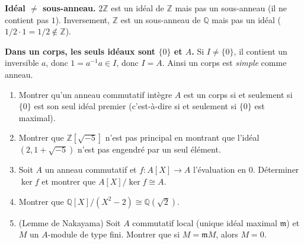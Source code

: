 \vspace{6pt}

\begin{mdframed}[style=cexbar]
  \textbf{Idéal $\neq$ sous-anneau.}\enspace%
  $2\mathbb{Z}$ est un idéal de $\mathbb{Z}$ mais pas un sous-anneau
  (il ne contient pas $1$). Inversement, $\mathbb{Z}$ est un sous-anneau de
  $\mathbb{Q}$ mais pas un idéal ($1/2 \cdot 1 = 1/2 \notin \mathbb{Z}$).

  \smallskip\noindent
  \textbf{Dans un corps, les seuls idéaux sont $\{0\}$ et $A$.}\enspace%
  Si $I \neq \{0\}$, il contient un inversible $a$, donc $1 = a^{-1}a \in I$,
  donc $I = A$. Ainsi un corps est \emph{simple} comme anneau.
\end{mdframed}

\vspace{6pt}
\exolabel

\begin{mdframed}[style=exobar]
  \begin{enumerate}
    \item Montrer qu'un anneau commutatif intègre $A$ est un corps si et
          seulement si $\{0\}$ est son seul idéal premier (c'est-à-dire si et
          seulement si $\{0\}$ est maximal).

    \item Montrer que $\mathbb{Z}[\sqrt{-5}]$ n'est pas principal en montrant
          que l'idéal $(2, 1+\sqrt{-5})$ n'est pas engendré par un seul élément.

    \item Soit $A$ un anneau commutatif et $f : A[X] \to A$ l'évaluation en $0$.
          Déterminer $\ker f$ et montrer que $A[X]/\ker f \cong A$.

    \item Montrer que $\mathbb{Q}[X]/(X^2-2) \cong \mathbb{Q}(\sqrt{2})$.

    \item (Lemme de Nakayama) Soit $A$ commutatif local (unique idéal maximal $\mathfrak{m}$)
          et $M$ un $A$-module de type fini. Montrer que si $M = \mathfrak{m}M$, alors $M = 0$.
  \end{enumerate}
\end{mdframed}

